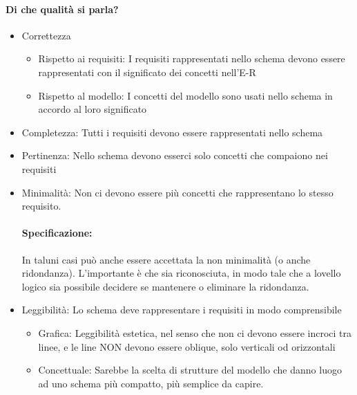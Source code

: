 \documentclass[12pt, a4paper, openany, twoside]{book}
\begin{document}
\paragraph{Di che qualità si parla?}
\begin{itemize}
	\item Correttezza
	\begin{itemize}
		\item Rispetto ai requisiti: I requisiti rappresentati nello schema
		devono essere rappresentati con il significato dei concetti nell'E-R
		\item Rispetto al modello: I concetti del modello sono usati nello schema
		in accordo al loro significato
	\end{itemize}
	\item Completezza: Tutti i requisiti devono essere rappresentati nello schema
	\item Pertinenza: Nello schema devono esserci solo concetti che compaiono nei 
	requisiti
	\item Minimalità: Non ci devono essere più concetti che rappresentano lo stesso
	requisito.
	\paragraph{Specificazione:} In taluni casi può anche essere accettata la non
	minimalità (o anche ridondanza). L'importante è che sia riconosciuta, in modo 
	tale che a lovello logico sia possibile decidere se mantenere o eliminare la
	ridondanza.
	\item Leggibilità: Lo schema deve rappresentare i requisiti in modo comprensibile 
	\begin{itemize}
		\item Grafica: Leggibilità estetica, nel senso che non ci devono essere
		incroci tra linee, e le line NON devono essere oblique, solo verticali
		od orizzontali
		\item Concettuale: Sarebbe la scelta di strutture del modello che danno
		luogo ad uno schema più compatto, più semplice da capire.
	\end{itemize}
\end{itemize}
\end{document}
